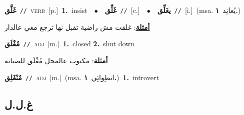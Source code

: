 \documentclass[10pt,a4paper,twoside]{article} %
\begin{document}
\begin{multicols}{2}
{\setlength\topsep{0pt}\textbf{\foreignlanguage{arabic}{غَلَّق}}\ {\color{gray}\texttt{//}\color{black}}\ \textsc{verb}\ [p.]\ \textbf{1.}~insist\ \ $\bullet$\ \ \setlength\topsep{0pt}\textbf{\foreignlanguage{arabic}{غَلِّق}}\ {\color{gray}\texttt{//}\color{black}}\ [c.]\ \ $\bullet$\ \ \setlength\topsep{0pt}\textbf{\foreignlanguage{arabic}{يغَلِّق}}\ {\color{gray}\texttt{//}\color{black}}\ [i.]\ \color{gray}(msa. \foreignlanguage{arabic}{يُعانِد}~\foreignlanguage{arabic}{\textbf{١.}})\color{black}\  \begin{flushright}\color{gray}\foreignlanguage{arabic}{\textbf{\underline{\foreignlanguage{arabic}{أمثلة}}}: غلقت مش راضية تقبل نها ترجع معي عالدار}\end{flushright}\color{black}} \vspace{2mm}

{\setlength\topsep{0pt}\textbf{\foreignlanguage{arabic}{مُغْلَق}}\ {\color{gray}\texttt{//}\color{black}}\ \textsc{adj}\ [m.]\ \textbf{1.}~closed  \textbf{2.}~shut down\  \begin{flushright}\color{gray}\foreignlanguage{arabic}{\textbf{\underline{\foreignlanguage{arabic}{أمثلة}}}: مكتوب عالمحل مُغْلَق للصيانة}\end{flushright}\color{black}} \vspace{2mm}

{\setlength\topsep{0pt}\textbf{\foreignlanguage{arabic}{مُنْغَلِق}}\ {\color{gray}\texttt{//}\color{black}}\ \textsc{adj}\ [m.]\ \color{gray}(msa. \foreignlanguage{arabic}{انطِوائِي}~\foreignlanguage{arabic}{\textbf{١.}})\color{black}\ \textbf{1.}~introvert\ } \vspace{2mm}

\vspace{-3mm}
\subsection*{\color{blue}\foreignlanguage{arabic}{غ.ل.ل}\color{blue}{}} 


\end{multicols}
\end{document}
